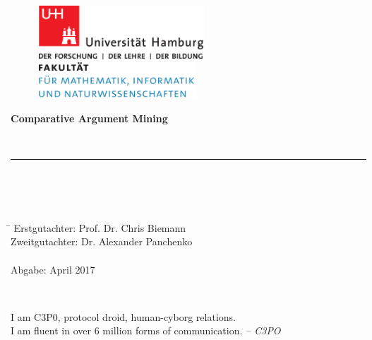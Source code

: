 \begin{titlepage}

  \setcounter{page}{-1}

	\begin{figure}[h]
		\begin{minipage}[b]{62mm}
			\includegraphics[width=62mm]{images/unilogo}
		\end{minipage}
		\hspace{4cm}
		\begin{minipage}[b]{59mm}
			\includegraphics[width=59mm]{images/minlogo}
		\end{minipage}
	\end{figure}

	\vfill
	
	\begin{center}
		\vspace{14mm}
		\noindent \textbf{\huge
		  Comparative Argument Mining
		}
		\vspace{60mm}	
	\end{center}
	
	\vfill
	
	 \\
	\noindent \rule{\textwidth}{0.4mm} 
	 \\
	 \\
	 \\
	\begin{tabbing}
	\hspace{8em} \=  \kill
	Erstgutachter: \> Prof. Dr. Chris Biemann \\
	Zweitgutachter: \> Dr. Alexander Panchenko \\
	~ \\
	Abgabe: April 2017
	\end{tabbing}
	
	\newpage 
	\thispagestyle{empty}
	\setcounter{page}{0}

	~\\ \vfill \noindent 
	
I am C3P0, protocol droid, human-cyborg relations.\\I am fluent in over 6 million forms of communication.
	\textit{-- C3PO}
\end{titlepage}


